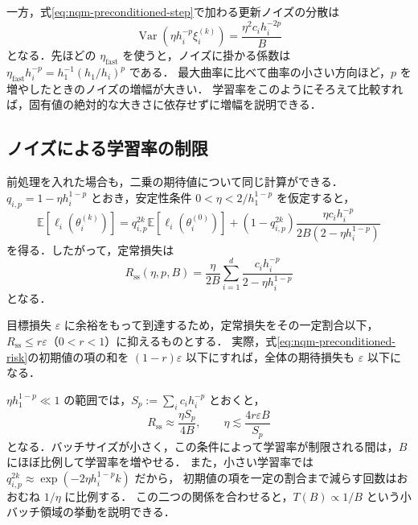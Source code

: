\documentclass[../main.tex]{subfiles}
\begin{document}
一方，式\eqref{eq:nqm-preconditioned-step}で加わる更新ノイズの分散は
\begin{equation}
  \operatorname{Var}(\eta h_i^{-p}\xi_i^{(k)})
  =\frac{\eta^2c_i h_i^{-2p}}{B}
  \label{eq:nqm-update-noise}
\end{equation}
となる．先ほどの $\eta_{\mathrm{fast}}$ を使うと，ノイズに掛かる係数は
$\eta_{\mathrm{fast}}h_i^{-p}=h_1^{-1}(h_1/h_i)^p$ である．
最大曲率に比べて曲率の小さい方向ほど，$p$ を増やしたときのノイズの増幅が大きい．
学習率をこのようにそろえて比較すれば，固有値の絶対的な大きさに依存せずに増幅を説明できる．

\subsection{ノイズによる学習率の制限}

前処理を入れた場合も，二乗の期待値について同じ計算ができる．
$q_{i,p}=1-\eta h_i^{1-p}$ とおき，安定性条件 $0<\eta<2/h_1^{1-p}$ を仮定すると，
\begin{equation}
  \mathbb{E}[\ell_i(\theta_i^{(k)})]
  =q_{i,p}^{2k}\mathbb{E}[\ell_i(\theta_i^{(0)})]
  +(1-q_{i,p}^{2k})
  \frac{\eta c_i h_i^{-p}}{2B(2-\eta h_i^{1-p})}
  \label{eq:nqm-preconditioned-risk}
\end{equation}
を得る．したがって，定常損失は
\begin{equation}
  R_{\mathrm{ss}}(\eta,p,B)
  =\frac{\eta}{2B}\sum_{i=1}^d
  \frac{c_i h_i^{-p}}{2-\eta h_i^{1-p}}
  \label{eq:nqm-preconditioned-steady}
\end{equation}
となる．

目標損失 $\varepsilon$ に余裕をもって到達するため，定常損失をその一定割合以下，
$R_{\mathrm{ss}}\leq r\varepsilon$（$0<r<1$）に抑えるものとする．
実際，式\eqref{eq:nqm-preconditioned-risk}の初期値の項の和を $(1-r)\varepsilon$ 以下にすれば，全体の期待損失も $\varepsilon$ 以下になる．

$\eta h_1^{1-p}\ll1$ の範囲では，$S_p:=\sum_i c_i h_i^{-p}$ とおくと，
\begin{equation}
  R_{\mathrm{ss}}\approx\frac{\eta S_p}{4B},
  \qquad
  \eta\lesssim\frac{4r\varepsilon B}{S_p}
  \label{eq:nqm-noise-lr}
\end{equation}
となる．バッチサイズが小さく，この条件によって学習率が制限される間は，$B$ にほぼ比例して学習率を増やせる．
また，小さい学習率では $q_{i,p}^{2k}\approx\exp(-2\eta h_i^{1-p}k)$ だから，
初期値の項を一定の割合まで減らす回数はおおむね $1/\eta$ に比例する．
この二つの関係を合わせると，$T(B)\propto1/B$ という小バッチ領域の挙動を説明できる．
\end{document}

